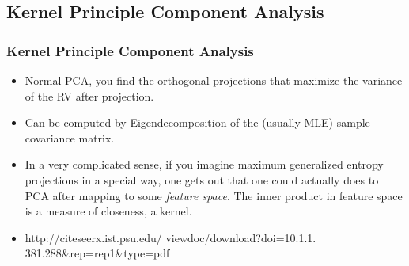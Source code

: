 \documentclass[xcolor=dvipsnames]{beamer}
\begin{document}
	\subsection{Kernel Principle Component Analysis}
	\begin{frame}
	\frametitle{Kernel Principle Component Analysis}
	\begin{itemize}
	    \item Normal PCA, you find the orthogonal projections that maximize the variance of the RV after projection. 
	    \pause 
	    \item Can be computed by Eigendecomposition of the (usually MLE) sample covariance matrix. 
	    \pause 
	    \item In a very complicated sense, if you imagine maximum generalized entropy projections in a special way, one gets out that one could actually does to PCA after mapping to some \textit{feature space}. The inner product in feature space is a measure of closeness, a kernel. 
	    \pause 
	    \item http://citeseerx.ist.psu.edu/ viewdoc/download?doi=10.1.1. 381.288&rep=rep1&type=pdf
	\end{itemize}
	\end{frame}
	
\end{document}
